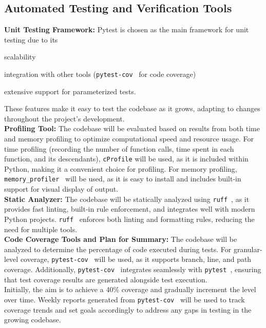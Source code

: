 \documentclass[12pt, titlepage]{article}
\begin{document}
\subsection{Automated Testing and Verification Tools}

\textbf{Unit Testing Framework:} Pytest is chosen as the main
framework for unit testing due to its
\begin{inparaenum}[(i)]
\item scalability
\item integration with other tools
  (\texttt{pytest-cov}~\cite{pytest-cov} for code coverage)
\item extensive support for parameterized tests.
\end{inparaenum} These features make it easy to test the codebase as
it grows, adapting to changes throughout the project's development.\\

\noindent\textbf{Profiling Tool:} The codebase will be evaluated
based on results from both time and memory profiling to optimize
computational speed and resource usage. For time profiling (recording
  the number of function calls, time spent in each function, and its
descendants), \texttt{cProfile} will be used, as it is included
within Python, making it a convenient choice for profiling. For
memory profiling, \texttt{memory\_profiler}~\cite{memory_profiler}
will be used, as it is easy to install and includes built-in support
for visual display of output.\\

\noindent\textbf{Static Analyzer:} The codebase will be statically
analyzed using \texttt{ruff}~\cite{ruff}, as it provides fast
linting, built-in rule enforcement, and integrates well with modern
Python projects. \texttt{ruff}~\cite{ruff} enforces both linting and
formatting rules, reducing the need for multiple tools.\\

\noindent\textbf{Code Coverage Tools and Plan for Summary:} The
codebase will be analyzed to determine the percentage of code
executed during tests. For granular-level coverage,
\texttt{pytest-cov}~\cite{pytest-cov} will be used, as it supports
branch, line, and path coverage. Additionally,
\texttt{pytest-cov}~\cite{pytest-cov} integrates seamlessly with
\texttt{pytest}~\cite{pytest}, ensuring that test coverage results
are generated alongside test execution.\\

Initially, the aim is to achieve a 40\% coverage and gradually
increment the level over time. Weekly reports generated from
\texttt{pytest-cov}~\cite{pytest-cov} will be used to track coverage
trends and set goals accordingly to address any gaps in testing in
the growing codebase.\\
\end{document}
